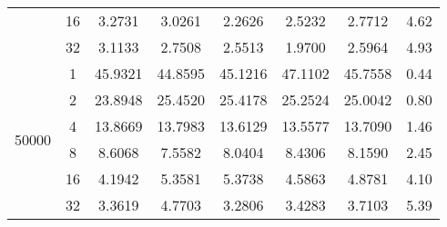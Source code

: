 \begin{tabularx}{\textwidth}{@{} c c c c c c c c @{}}
                               & 16 & 3.2731  & 3.0261  & 2.2626  & 2.5232  & 2.7712  & 4.62 \\
                               & 32 & 3.1133  & 2.7508  & 2.5513  & 1.9700  & 2.5964  & 4.93 \\
    \midrule
        \multirow{6}{*}{50000} & 1  & 45.9321 & 44.8595 & 45.1216 & 47.1102 & 45.7558 & 0.44 \\
                               & 2  & 23.8948 & 25.4520 & 25.4178 & 25.2524 & 25.0042 & 0.80 \\
                               & 4  & 13.8669 & 13.7983 & 13.6129 & 13.5577 & 13.7090 & 1.46 \\
                               & 8  & 8.6068  & 7.5582  & 8.0404  & 8.4306  & 8.1590  & 2.45 \\
                               & 16 & 4.1942  & 5.3581  & 5.3738  & 4.5863  & 4.8781  & 4.10 \\
                               & 32 & 3.3619  & 4.7703  & 3.2806  & 3.4283  & 3.7103  & 5.39 \\
    \bottomrule
\end{tabularx}